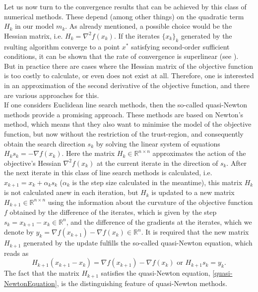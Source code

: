 Let us now turn to the convergence results that can be achieved by this class of numerical methods. These depend (among other things) on the quadratic term $H_k$ in our model $m_k$. As already mentioned, a possible choice would be the Hessian matrix, i.e. $H_k = \nabla^2 f(x_k)$. If the iterates $\{ x_k \}_k$ generated by the rsulting algorithm converge to a point $x^*$ satisfying second-order sufficient conditions, it can be shown that the rate of convergence is superlinear (see \cite[4.4~Local~convergence~of~trust-region~Newton~methods]{NocedalWright:2006}). \\
But in practice there are cases where the Hessian matrix of the objective function is too costly to calculate, or even does not exist at all. Therefore, one is interested in an approximation of the second derivative of the objective function, and there are various approaches for this. \\
If one considers Euclidean line search methods, then the so-called quasi-Newton methods provide a promising approach. These methods are based on Newton's method, which means that they also want to minimise the model of the objective function, but now without the restriction of the trust-region, and consequently obtain the search direction $s_k$ by solving the linear system of equations $H_k s_k = - \nabla f(x_k)$. Here the matrix $H_k \in \mathbb{R}^{n \times n}$ approximates the action of the objective's Hessian $\nabla^{2} f(x_k)$ at the current iterate in the direction of $s_k$. After the next iterate in this class of line search methods is calculated, i.e. $x_{k+1} = x_k + \alpha_k s_k$ ($\alpha_k$ is the step size calculated in the meantime), this matrix $H_k$ is not calculated anew in each iteration, but $H_k$ is updated to a new matrix $H_{k+1} \in \mathbb{R}^{n \times n}$ using the information about the curvature of the objective function $f$ obtained by the difference of the iterates, which is given by the step $s_k = x_{k+1} - x_k \in \mathbb{R}^n$, and the difference of the gradients at the iterates, which we denote by $y_k = \nabla f(x_{k+1}) - \nabla f(x_k) \in \mathbb{R}^n$. It is required that the new matrix $H_{k+1}$ generated by the update fulfills the so-called quasi-Newton equation, which reads as 
\begin{equation}\label{quasi-NewtonEquation}
    H_{k+1} (x_{k+1} - x_k) = \nabla f(x_{k+1}) - \nabla f(x_k) \text{ or } H_{k+1} s_k = y_k.
\end{equation}
The fact that the matrix $H_{k+1}$ satisfies the quasi-Newton equation, \cref{quasi-NewtonEquation}, is the distinguishing feature of quasi-Newton methods. \\

